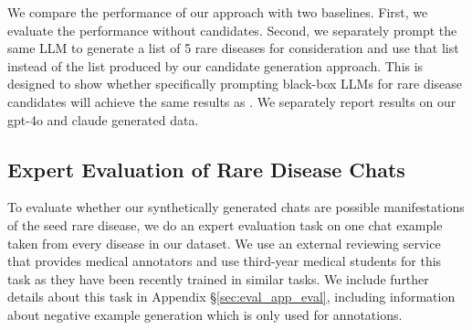 We compare the performance of our approach with two baselines.  First, we evaluate the performance without candidates.  Second, we separately prompt the same LLM to generate a list of 5 rare diseases for consideration and use that list instead of the list produced by our candidate generation approach.  This is designed to show whether specifically prompting black-box LLMs for rare disease candidates will achieve the same results as \methodname.  We separately report results on our gpt-4o and claude generated data.


\subsection{Expert Evaluation of Rare Disease Chats}\label{sec:eval_exp}
To evaluate whether our synthetically generated chats are possible manifestations of the seed rare disease, we do an expert evaluation task on one chat example taken from every disease in our dataset.  We use an external reviewing service that provides medical annotators and use third-year medical students for this task as they have been recently trained in similar tasks. We include further details about this task in Appendix \S \ref{sec:eval_app_eval}, including information about negative example generation which is only used for annotations.
